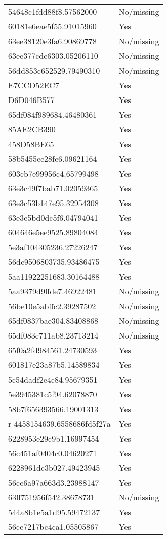 \begin{tabular}{ll}
54648c1fdd88f8.57562000 & No/missing \\
60181e6eae5f55.91015960 & Yes \\
63ee38120e3fa6.90869778 & No/missing \\
63ee377cde6303.05206110 & No/missing \\
56dd853c652529.79490310 & No/missing \\
E7CCD52EC7 & Yes \\
D6D046B577 & Yes \\
65df084f989684.46480361 & Yes \\
85AE2CB390 & Yes \\
458D58BE65 & Yes \\
58b5455ec28fc6.09621164 & Yes \\
603cb7e99956c4.65799498 & Yes \\
63e3c49f7bab71.02059365 & Yes \\
63e3c53b147e95.32954308 & Yes \\
63e3c5bd0dc5f6.04794041 & Yes \\
604646e5ee9525.89804084 & Yes \\
5e3af104305236.27226247 & Yes \\
56dc9506803735.93486475 & Yes \\
5aa11922251683.30164488 & Yes \\
5aa9379d9ffde7.46922481 & No/missing \\
56be10e5abffc2.39287502 & No/missing \\
65df0837bae304.83408868 & No/missing \\
65df083c711ab8.23713214 & No/missing \\
65f0a2fd984561.24730593 & Yes \\
601817e23a87b5.14589834 & Yes \\
5c54dadf2e4c84.95679351 & Yes \\
5e3945381c5f94.62078870 & Yes \\
58b7f656393566.19001313 & Yes \\
r-4458154639.6558686fd5f27a & Yes \\
6228953e29c9b1.16997454 & Yes \\
56c451af0404c0.04620271 & Yes \\
6228961dc3b027.49423945 & Yes \\
56cc6a97a663d3.23988147 & Yes \\
63ff751956f542.38678731 & No/missing \\
544a8b1e5a1d95.59472137 & Yes \\
56cc7217bc4ca1.05505867 & Yes \\

\end{tabular}

